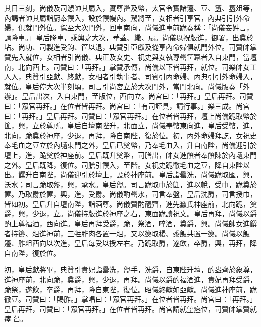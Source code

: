 \begin{pinyinscope}
 其日三刻，尚儀及司愬帥其屬入，實尊罍及幣，太官令實諸籩、豆、簠、簋俎等，內謁者帥其屬詣廚奉饌入，設於饌幔內。駕將至，女相者引享官，內典引引外命婦，俱就門外位。駕至大次門外，回車南向，尚儀進車前跪奏稱：「尚儀妾姓言，請降車。」皇后降車，乘輿之大次，華蓋、繖、扇。尚儀以祝版進，御署，出奠於坫。尚功、司製進受鉤、筐以退，典贊引亞獻及從享內命婦俱就門外位。司贊帥掌贊先入就位，女相者引尚儀、典正及女史、祝史與女執尊罍筐冪者入自東門，當壇南，北向西上。司贊曰：「再拜。」掌贊承傳，尚儀以下皆再拜，就位。司樂帥女工人入，典贊引亞獻、終獻，女相者引執事者、司賓引內命婦、內典引引外命婦入，就位。皇后停大次半刻頃，司言引尚宮立於大次門外，當門北向。尚儀版奏「外辦」。皇后出次，入自東門，至版位，西向立。尚宮曰：「再拜。」皇后再拜。司贊曰：「眾官再拜。」在位者皆再拜。尚宮曰：「有司謹具，請行事。」樂三成。尚宮曰：「再拜。」皇后再拜。司贊曰：「眾官再拜。」在位者皆再拜，壇上尚儀跪取幣於篚，興，立於尊所。皇后自壇南陛升，北面立，尚儀奉幣東向進，皇后受幣，進，北向，跪奠於神座，少退，再拜，降自南陛，復於位。初，內外命婦拜訖，女祝史奉毛血之豆立於內壝東門之外，皇后已奠幣，乃奉毛血入，升自南陛，尚儀迎引於壇上，進，跪奠於神座前。皇后既升奠幣，司膳出，帥女進饌者奉饌陳於內壝東門之外。皇后既降，復位。司膳引饌入，至階。女祝史跪徹毛血之豆，降自東陛以出。饌升自南陛，尚儀迎引於壇上，設於神座前。皇后詣罍洗，尚儀跪取匜，興，沃水；司言跪取盤，興，承水。皇后盥。司言跪取巾於篚，進以帨，受巾，跪奠於篚。乃取爵於篚，興，進，受爵。尚儀酌罍水，司言奉盤，皇后洗爵，司言授巾，皆如初。皇后升自壇南陛，詣酒尊。尚儀贊酌醴齊，進先蠶氏神座前，北向跪，奠爵，興，少退，立。尚儀持版進於神座之右，東面跪讀祝文。皇后再拜，尚儀以爵酌上尊福酒，西向進。皇后再拜受爵，跪，祭酒，啐酒，奠爵，興。尚儀帥女進饌者持籩、俎進神前，三牲胙肉各置一俎，又以籩取稷、黍飯共置一籩。尚儀以飯籩、胙俎西向以次進，皇后每受以授左右。乃跪取爵，遂飲，卒爵，興，再拜，降自南陛，復於位。



 初，皇后獻將畢，典贊引貴妃詣罍洗，盥手，洗爵，自東陛升壇，酌盎齊於象尊，進神座前，北向跪，奠爵，興，少退，再拜。尚儀以爵酌福酒進，貴妃再拜受爵，跪祭，遂飲，卒爵，再拜，降自東陛，復位。昭儀終獻如亞獻。尚儀進神座前，跪徹豆。司贊曰：「賜胙。」掌唱曰：「眾官再拜。」在位者皆再拜。尚宮曰：「再拜。」皇后再拜，司贊曰：「眾官再拜。」在位者皆再拜。尚宮請就望瘞位，司贊帥掌贊就瘞臽。



\end{pinyinscope}